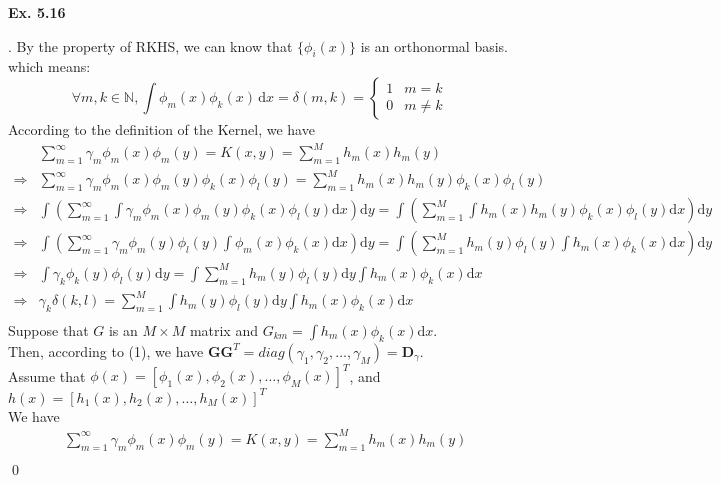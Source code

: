 \documentclass[12pt]{article}
\newenvironment{sol}
  {\par\vspace{3mm}\noindent{\it Solution}.}
  {\qed}
\begin{document}
\begin{flushleft}
\textbf{Ex. 5.16}
\end{flushleft}
\begin{sol}
By the property of RKHS, we can know that $\{\phi_i(x)\}$ is an orthonormal basis. which means:
$$\forall m,k\in\mathbb{N},\int\phi_m(x)\phi_k(x)\,\mathrm{d}x=\delta(m,k)=\left\{\begin{matrix}1 & m=k\\0 & m\neq k\end{matrix}\right.$$
According to the definition of the Kernel, we have
\begin{equation}
\begin{split}
&\sum\limits_{m=1}^{\infty}\gamma_m\phi_m(x)\phi_m(y)=K(x,y)=\sum_{m=1}^Mh_m(x)h_m(y)\\
\Longrightarrow &\sum\limits_{m=1}^{\infty}\gamma_m\phi_m(x)\phi_m(y)\phi_k(x)\phi_l(y)=\sum_{m=1}^Mh_m(x)h_m(y)\phi_k(x)\phi_l(y)\\
\Longrightarrow &\int\left(\sum\limits_{m=1}^{\infty}\int\gamma_m\phi_m(x)\phi_m(y)\phi_k(x)\phi_l(y)\mathrm{d}x\right)\mathrm{d}y
=\int\left(\sum_{m=1}^M\int h_m(x)h_m(y)\phi_k(x)\phi_l(y)\mathrm{d}x\right)\mathrm{d}y\\
\Longrightarrow &\int\left(\sum\limits_{m=1}^{\infty}\gamma_m\phi_m(y)\phi_l(y)\int\phi_m(x)\phi_k(x)\mathrm{d}x\right)\mathrm{d}y
=\int\left(\sum_{m=1}^Mh_m(y)\phi_l(y)\int h_m(x)\phi_k(x)\mathrm{d}x\right)\mathrm{d}y\\
\Longrightarrow &\int\gamma_k\phi_k(y)\phi_l(y)\mathrm{d}y=\int\sum_{m=1}^Mh_m(y)\phi_l(y)\mathrm{d}y\int h_m(x)\phi_k(x)\mathrm{d}x\\
\Longrightarrow &\gamma_k\delta(k,l)=\sum_{m=1}^M\int h_m(y)\phi_l(y)\mathrm{d}y\int h_m(x)\phi_k(x)\mathrm{d}x\\
\end{split}
\end{equation}
Suppose that $G$ is an $M \times M$ matrix and $G_{km} = \int h_m(x)\phi_k(x)\mathrm{d}x$.\\
Then, according to (1), we have $\mathbf{GG}^T=diag(\gamma_1,\gamma_2,\dots,\gamma_M)=\mathbf{D}_\gamma$.\\
Assume that $\phi(x)=[\phi_1(x),\phi_2(x),\dots,\phi_M(x)]^T$, and $h(x)=[h_1(x),h_2(x),\dots,h_M(x)]^T$\\
We have
\begin{equation*}
\begin{split}
&\sum\limits_{m=1}^{\infty}\gamma_m\phi_m(x)\phi_m(y)=K(x,y)=\sum_{m=1}^Mh_m(x)h_m(y)\\

\end{split}
\end{equation*}
\end{sol}
\end{document}
